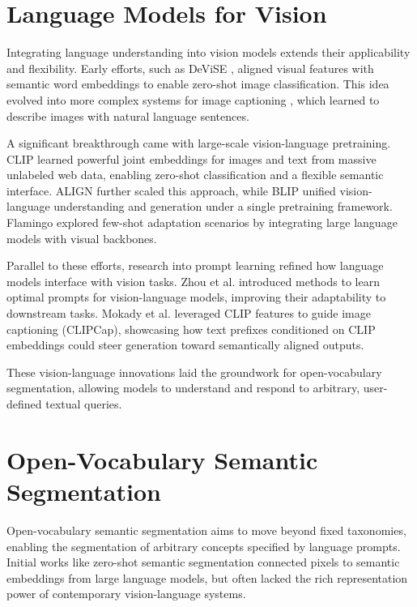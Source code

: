 \section{Language Models for Vision}
Integrating language understanding into vision models extends their applicability and flexibility. Early efforts, such as DeViSE \cite{frome2013devise}, aligned visual features with semantic word embeddings to enable zero-shot image classification. This idea evolved into more complex systems for image captioning \cite{karpathy2015deep}, which learned to describe images with natural language sentences.

A significant breakthrough came with large-scale vision-language pretraining. CLIP \cite{radford2021learning} learned powerful joint embeddings for images and text from massive unlabeled web data, enabling zero-shot classification and a flexible semantic interface. ALIGN \cite{jia2021scaling} further scaled this approach, while BLIP \cite{li2022blip} unified vision-language understanding and generation under a single pretraining framework. Flamingo \cite{alayrac2022flamingo} explored few-shot adaptation scenarios by integrating large language models with visual backbones.

Parallel to these efforts, research into prompt learning refined how language models interface with vision tasks. Zhou et al. \cite{zhou2022learning} introduced methods to learn optimal prompts for vision-language models, improving their adaptability to downstream tasks. Mokady et al. \cite{mokady2021clipcap} leveraged CLIP features to guide image captioning (CLIPCap), showcasing how text prefixes conditioned on CLIP embeddings could steer generation toward semantically aligned outputs.

These vision-language innovations laid the groundwork for open-vocabulary segmentation, allowing models to understand and respond to arbitrary, user-defined textual queries.

\section{Open-Vocabulary Semantic Segmentation}
Open-vocabulary semantic segmentation aims to move beyond fixed taxonomies, enabling the segmentation of arbitrary concepts specified by language prompts. Initial works like zero-shot semantic segmentation \cite{bucher2019zero} connected pixels to semantic embeddings from large language models, but often lacked the rich representation power of contemporary vision-language systems.

